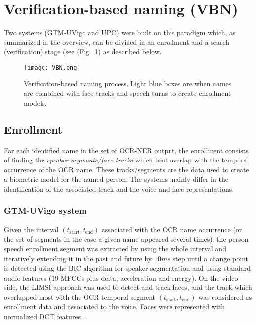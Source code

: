\section{Verification-based naming (VBN)}
\label{sec:verification}

Two systems (GTM-UVigo and UPC) were built on this paradigm which, 
as summarized in the overview, can be divided in an enrollment and a 
search (verification) stage (see (Fig.~\ref{fig:vbn}) 
as described below.

\begin{figure}[tb]
 \centering
 \texttt{[image: VBN.png]}
\vspace*{-7mm}
 \caption{Verification-based naming process. Light blue boxes are when names are combined with face tracks and speech turns to create enrollment models.}
\vspace*{-3mm}
 \label{fig:vbn}
\end{figure}

\subsection{Enrollment}


For each identified name in the set of OCR-NER output, the enrollment consists of finding the  \textit{speaker segments/face tracks} 
which best overlap with the temporal occurrence of the OCR name. 
These tracks/segments are the data used to create a biometric model for the named person. 
%
The systems mainly differ in the identification of the associated track and the voice and face  representations.


\subsubsection{GTM-UVigo system}
%
Given the interval  $(t_{\mathrm{start}},t_{\mathrm{end}})$ associated with the OCR name occurrence (or the set 
of segments in the case a given name appeared several times), the person speech enrollment segment was extracted by 
using the whole interval and iteratively  extending it in the past and future  by $10ms$ step until a change point 
is detected using the BIC algorithm for speaker segmentation and using standard audio features (19 MFCCs plus delta, acceleration and energy).
%
On the video side, the LIMSI approach was used to detect and track faces, and the track which overlapped most with the OCR temporal 
segment  $(t_{\mathrm{start}},t_{\mathrm{end}})$ was considered as enrollment data and associated to the voice.
Faces were represented with normalized DCT features~\cite{anjos2012bob}.

